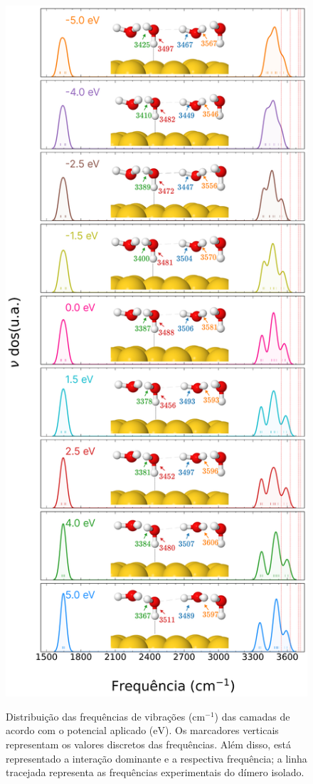 \begin{figure}[H]
	\centering
	\caption{Distribuição das frequências de vibrações ($\si{\cm}^{-1}$) das camadas de acordo com o potencial aplicado ($ \si{\eV} $). Os marcadores verticais representam os valores discretos das frequências. Além disso, está representado a interação dominante e a respectiva frequência; a linha tracejada representa as frequências experimentais do dímero isolado.}
	\includegraphics[scale=0.15]{figs/freq_layer.jpg}
	\label{fig:neq_au_freq}
\end{figure}

